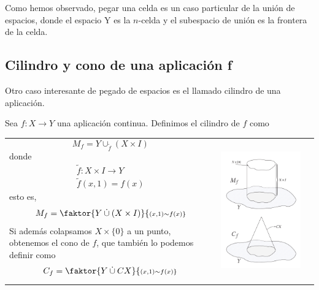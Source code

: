 Como hemos observado, pegar una celda es un caso particular de la unión de espacios, donde el espacio Y es la $n$-celda y el subespacio de unión es la frontera de la celda. 
\subsection*{Cilindro y cono de una aplicación f}
Otro caso interesante de pegado de espacios es el llamado cilindro de una aplicación. \par
Sea $f: X \longrightarrow Y$ una aplicación continua. Definimos el cilindro de $f$ como \par
\begin{tabular}{ll}
\begin{minipage}{0.5\textwidth}
\[M_f = Y \cup_{\tilde{f}} (X \times I) \] 
donde
\begin{align*}
\tilde{f} : X \times I \longrightarrow Y \\
\tilde{f}(x,1) = f(x)
\end{align*}
esto es, 
\[ M_f = \faktor{Y \: \dot{\cup} \: (X \times I)}{\scriptstyle(x,1) \sim f(x)} \]
Si además colapsamos $X \times \{0\}$ a un punto, obtenemos el cono de $f$, que también lo podemos definir como 
\[ C_f = \faktor{Y \: \dot{\cup} \: CX}{\scriptstyle (x,1) \sim f(x)} \]
\end{minipage}
&
\begin{minipage}{0.5\textwidth}
\centering
\includegraphics[width = 0.9\textwidth]{images/cilindyconodef}
\end{minipage}
\end{tabular}


